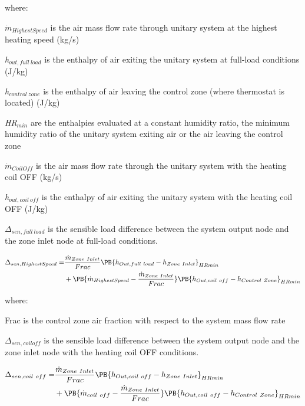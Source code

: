 where:

\emph{\({\dot m_{HighestSpeed}}\)} is the air mass flow rate through unitary system at the highest heating speed (kg/s)

\emph{h\(_{out, full~load}\)} is the enthalpy of air exiting the unitary system at full-load conditions (J/kg)

\emph{h\(_{control~zone}\)} is the enthalpy of air leaving the control zone (where thermostat is located) (J/kg)

\emph{HR\(_{min}\)} are the enthalpies evaluated at a constant humidity ratio, the minimum humidity ratio of the unitary system exiting air or the air leaving the control zone

\({\dot m_{CoilOff}}\) is the air mass flow rate through the unitary system with the heating coil OFF (kg/s)

\emph{h\(_{out,coil~off}\)} is the enthalpy of air exiting the unitary system with the heating coil OFF (J/kg)

\(\Delta_{sen,full~load}\) is the sensible load difference between the system output node and the zone inlet node at full-load conditions.

\begin{equation}
  \begin{split}
    \Delta_{sen,HighestSpeed} =& \frac{\dot{m}_{Zone~Inlet}}{Frac} \PB{h_{Out,full~load} - h_{Zone~Inlet}}_{HRmin} \\
                              &+ \PB{\dot{m}_{HighestSpeed} - \frac{\dot{m}_{Zone~Inlet}}{Frac}} \PB{h_{Out,coil~off} - h_{Control~Zone}}_{HRmin}
  \end{split}
\end{equation}

where:

Frac is the control zone air fraction with respect to the system mass flow rate

\(\Delta_{sen,coil off}\) is the sensible load difference between the system output node and the zone inlet node with the heating coil OFF conditions.

\begin{equation}
  \begin{split}
    \Delta_{sen,coil~off} =& \frac{\dot{m}_{Zone~Inlet}}{Frac} \PB{h_{Out,coil~off} - h_{Zone~Inlet}}_{HRmin} \\
                              &+ \PB{\dot{m}_{coil~off} - \frac{\dot{m}_{Zone~Inlet}}{Frac}} \PB{h_{Out,coil~off} - h_{Control~Zone}}_{HRmin}
  \end{split}
\end{equation}

